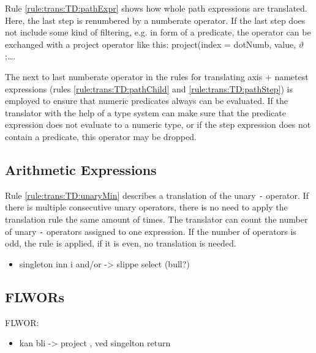 Rule \ref{rule:trans:TD:pathExpr} shows how whole path expressions are translated. Here, the last step is
renumbered by a \textsf{numberate} operator. If the last step does not include some kind of filtering, e.g. in
form of a predicate, the operator can be exchanged with a \textsf{project} operator like this:
\textsf{project(index = dotNumb, value, }$\vartheta$\textsf{;\ldots}.

The next to last \textsf{numberate} operator in the rules for translating axis + nametest expressions (rules
\ref{rule:trans:TD:pathChild} and \ref{rule:trans:TD:pathStep}) is employed to ensure that numeric predicates
always can be evaluated. If the translator with the help of a type system can make sure that the predicate
expression does not evaluate to a numeric type, or if the step expression does not contain a predicate, this
operator may be dropped.

\subsection{Arithmetic Expressions}
\label{sect:trans:TD:simpl:arith}

Rule \ref{rule:trans:TD:unaryMin} describes a translation of the unary \texttt{-} operator. If there is multiple
consecutive unary operators, there is no need to apply the translation rule the same amount of times. The
translator can count the number of unary \texttt{-} operators assigned to one expression. If the number of
operators is odd, the rule is applied, if it is even, no translation is needed.

	\begin{itemize}
      \item singleton inn i and/or -> slippe select (bull?)
    \end{itemize}



\subsection{FLWORs}
\label{sect:trans:TD:simpl:flwor}        
  FLWOR:
  	\begin{itemize}
        \item  kan bli -> project , ved singelton return
      \end{itemize}

